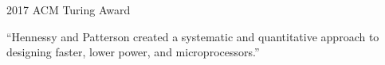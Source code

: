 
\begin{frame}{}
  \begin{center}
    2017 ACM Turing Award
  \end{center}

  \vspace{0.30cm}
  \begin{center}
    ``Hennessy and Patterson created a systematic and quantitative approach
    to designing faster, lower power,
    and  microprocessors.''
  \end{center}
\end{frame}

\begin{frame}{}
  \begin{columns}
  \end{columns}
\end{frame}

\begin{frame}{}
\end{frame}

\begin{frame}{}
\end{frame}

